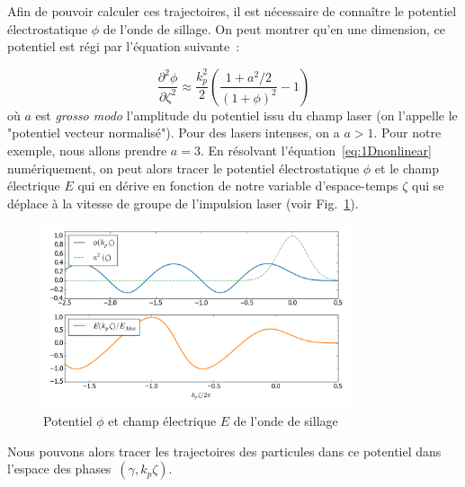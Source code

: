 \documentclass[a4paper]{book}
\begin{document}
Afin de pouvoir calculer ces trajectoires, il est nécessaire de connaître le potentiel électrostatique $\phi$ de l'onde de sillage. On peut montrer qu'en une dimension, ce potentiel est régi par l'équation suivante~:

\begin{equation}
    \frac{\partial^2 \phi}{\partial \zeta ^2 }\approx\frac{k_p^2}{2}\left(\frac{1+a^2/2}{(1+\phi)^2}-1\right)
    \label{eq:1Dnonlinear}
\end{equation}
où $a$ est \textit{grosso modo} l'amplitude du potentiel issu du champ laser (on l'appelle le "potentiel vecteur normalisé"). Pour des lasers intenses, on a $a>1$. Pour notre exemple, nous allons prendre $a=3$. En résolvant l'équation~\ref{eq:1Dnonlinear} numériquement, on peut alors tracer le potentiel électrostatique $\phi$ et le champ électrique $E$ qui en dérive en fonction de notre variable d'espace-temps $\zeta$ qui se déplace à la vitesse de groupe de l'impulsion laser (voir Fig.~\ref{fig:1D_pot_field}). 


\begin{figure}[!htbp]
\begin{center}
\includegraphics[width=9cm]{1D_Field_and_Potential.png}
\end{center}
\caption{Potentiel $\phi$ et champ électrique $E$ de l'onde de sillage}
\label{fig:1D_pot_field}
\end{figure}

Nous pouvons alors tracer les trajectoires des particules dans ce potentiel dans l'espace des phases~$(\gamma, k_p\zeta)$.
\end{document}
